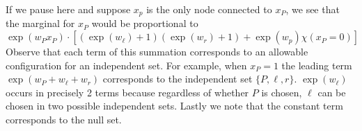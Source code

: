 If we pause here and suppose $x_p$ is the only node connected to $x_P$, we see that the marginal for $x_P$ would be proportional to
$$
\exp(w_P x_P)\cdot\left[\left(\exp(w_\ell)+ 1\right)\left(\exp(w_r) + 1\right) + \exp(w_p)\chi(x_P = 0)\right]
$$
Observe that each term of this summation corresponds to an allowable configuration for an independent set.  For example, when $x_P = 1$ the leading term $\exp(w_P + w_\ell + w_r)$ corresponds to the independent set $\{P, \ell, r\}$.  $\exp(w_\ell)$ occurs in precisely 2 terms because regardless of whether $P$ is chosen, $\ell$ can be chosen in two possible independent sets.  Lastly we note that the constant term corresponds to the null set.